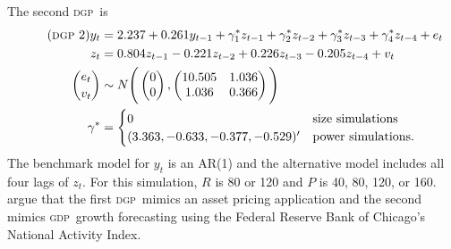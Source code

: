 \documentclass[10pt,fleqn,draft]{article}
\theoremstyle{definition}
\newcommand{\dgp}{\textsc{dgp}}
\newcommand{\gdp}{\textsc{gdp}}
\newcommand{\oos}{\textsc{oos}}
\begin{document}
\begin{table}[tb]
  \centering
  
  \caption{Size and power of the \oos\ tests under \eqref{eq:dgp1} at
    \testsize\% confidence.  These percentages are calculated from \totalsims\
    samples.  Pr[\textsc{cw}] shows the fraction of simulations for which Clark
    and West's (2007) statistic rejects; Pr[new] shows the fraction of
    simulations for which this paper's test rejects; and Pr[disagree]
    gives the fraction of simulations in which this paper's test and
    Clark and West's (2007) give different conclusions.}
\label{tab:mc1}
\end{table}

The second \dgp\ is
\begin{align} \label{eq:dgp2}\tag{\dgp\ 2}
  y_{t} &= 2.237 + 0.261 y_{t-1} + \gamma^{*}_{1} z_{t-1} + \gamma_{2}^{*}
  z_{t-2} + \gamma_{3}^{*} z_{t-3} + \gamma_{4}^{*} z_{t-4} + e_{t} \\
  z_{t} &= 0.804 z_{t-1} - 0.221 z_{t-2} + 0.226 z_{t-3} - 0.205
  z_{t-4} + v_{t} \nonumber \\
  \binom{e_{t}}{v_{t}} &\sim N\Bigg(
  \begin{pmatrix}
    0 \\ 0
  \end{pmatrix},
  \begin{pmatrix}
    10.505 & 1.036 \\ 1.036 & 0.366
  \end{pmatrix}
  \Bigg) \nonumber\\\nonumber
  \gamma^{*} &=
  \begin{cases}
    0 & \text{size simulations}\\
    (3.363, -0.633, -0.377, -0.529)' & \text{power simulations}.
  \end{cases}
\end{align}
The benchmark model for $y_{t}$ is an AR(1) and the alternative model
includes all four lags of $z_{t}$.  For this simulation, $R$ is 80 or
120 and $P$ is 40, 80, 120, or 160.  \citet{ClW:07} argue that the
first \dgp\ mimics an asset pricing application and the second mimics
\gdp\ growth forecasting using the Federal Reserve Bank of Chicago's
National Activity Index.

\begin{table}[tb]
  \centering
  
  \caption{Size and power of the \oos\ tests under \eqref{eq:dgp2} at
    \testsize\% confidence.  These percentages are calculated from \totalsims\
    samples.  Pr[\textsc{cw}] shows the fraction of simulations for which Clark
    and West's (2007) statistic rejects; Pr[new] shows the fraction of
    simulations for which this paper's test rejects; Pr[disagree] gives
    the fraction of simulations in which this paper's test and Clark and
    West's (2007) give different conclusions.}
\label{tab:mc2}
\end{table}
\end{document}
